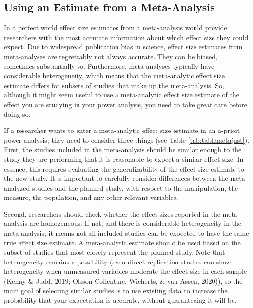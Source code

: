 \documentclass[
  english,
  ,jou,floatsintext]{apa6}
\begin{document}
\hypertarget{using-an-estimate-from-a-meta-analysis}{%
\subsection{Using an Estimate from a Meta-Analysis}\label{using-an-estimate-from-a-meta-analysis}}

In a perfect world effect size estimates from a meta-analysis would provide researchers with the most accurate information about which effect size they could expect. Due to widespread publication bias in science, effect size estimates from meta-analyses are regrettably not always accurate. They can be biased, sometimes substantially so. Furthermore, meta-analyses typically have considerable heterogeneity, which means that the meta-analytic effect size estimate differs for subsets of studies that make up the meta-analysis. So, although it might seem useful to use a meta-analytic effect size estimate of the effect you are studying in your power analysis, you need to take great care before doing so.

If a researcher wants to enter a meta-analytic effect size estimate in an a-priori power analysis, they need to consider three things (see Table \ref{tab:tablemetajust}). First, the studies included in the meta-analysis should be similar enough to the study they are performing that it is reasonable to expect a similar effect size. In essence, this requires evaluating the generalizability of the effect size estimate to the new study. It is important to carefully consider differences between the meta-analyzed studies and the planned study, with respect to the manipulation, the measure, the population, and any other relevant variables.

Second, researchers should check whether the effect sizes reported in the meta-analysis are homogeneous. If not, and there is considerable heterogeneity in the meta-analysis, it means not all included studies can be expected to have the same true effect size estimate. A meta-analytic estimate should be used based on the subset of studies that most closely represent the planned study. Note that heterogeneity remains a possibility (even direct replication studies can show heterogeneity when unmeasured variables moderate the effect size in each sample (Kenny \& Judd, 2019; Olsson-Collentine, Wicherts, \& van Assen, 2020)), so the main goal of selecting similar studies is to use existing data to increase the probability that your expectation is accurate, without guaranteeing it will be.
\end{document}
